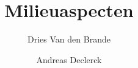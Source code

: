 \usepackage[dutch]{babel}
\usepackage{amsmath}

\title{Milieuaspecten}
\author{Dries Van den Brande \and Andreas Declerck}